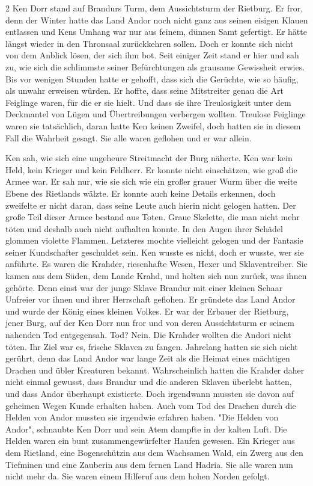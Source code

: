 \documentclass[10pt, a4paper, oneside]{book}
\begin{document}
\begin{multicols}{2}
Ken Dorr stand auf Brandurs Turm, dem Aussichtsturm der Rietburg. Er fror, denn der Winter hatte das Land Andor noch nicht ganz aus seinen eisigen Klauen entlassen und Kens Umhang war nur aus feinem, dünnen Samt gefertigt. Er hätte längst wieder in den Thronsaal zurückkehren sollen. Doch er konnte sich nicht von dem Anblick lösen, der sich ihm bot. Seit einiger Zeit stand er hier und sah zu, wie sich die schlimmste seiner Befürchtungen als grausame Gewissheit erwies. Bis vor wenigen Stunden hatte er gehofft, dass sich die Gerüchte, wie so häufig, als unwahr erweisen würden. Er hoffte, dass seine Mitstreiter genau die Art Feiglinge waren, für die er sie hielt. Und dass sie ihre Treulosigkeit unter dem Deckmantel von Lügen und Übertreibungen verbergen wollten. Treulose Feiglinge waren sie tatsächlich, daran hatte Ken keinen Zweifel, doch hatten sie in diesem Fall die Wahrheit gesagt. Sie alle waren geflohen und er war allein. 

Ken sah, wie sich eine ungeheure Streitmacht der Burg näherte. Ken war kein Held, kein Krieger und kein Feldherr. Er konnte nicht einschätzen, wie groß die Armee war. Er sah nur, wie sie sich wie ein großer grauer Wurm über die weite Ebene des Rietlands wälzte. Er konnte auch keine Details erkennen, doch zweifelte er nicht daran, dass seine Leute auch hierin nicht gelogen hatten. Der große Teil dieser Armee bestand aus Toten. Graue Skelette, die man nicht mehr töten und deshalb auch nicht aufhalten konnte. In den Augen ihrer Schädel glommen violette Flammen. Letzteres mochte vielleicht gelogen und der Fantasie seiner Kundschafter geschuldet sein. Ken wusste es nicht, doch er wusste, wer sie anführte. Es waren die Krahder, riesenhafte Wesen, Hexer und Sklaventreiber. Sie kamen aus dem Süden, dem Lande Krahd, und holten sich nun zurück, was ihnen gehörte. Denn einst war der junge Sklave Brandur mit einer kleinen Schaar Unfreier vor ihnen und ihrer Herrschaft geflohen. Er gründete das Land Andor und wurde der König eines kleinen Volkes. Er war der Erbauer der Rietburg, jener Burg, auf der Ken Dorr nun fror und von deren Aussichtsturm er seinem nahenden Tod entgegensah. Tod? Nein. Die Krahder wollten die Andori nicht töten. Ihr Ziel war es, frische Sklaven zu fangen. Jahrelang hatten sie sich nicht gerührt, denn das Land Andor war lange Zeit als die Heimat eines mächtigen Drachen und übler Kreaturen bekannt. Wahrscheinlich hatten die Krahder daher nicht einmal gewusst, dass Brandur und die anderen Sklaven überlebt hatten, und dass Andor überhaupt existierte. Doch irgendwann mussten sie davon auf geheimen Wegen Kunde erhalten haben. Auch vom Tod des Drachen durch die Helden von Andor mussten sie irgendwie erfahren haben. "Die Helden von Andor", schnaubte Ken Dorr und sein Atem dampfte in der kalten Luft. Die Helden waren ein bunt zusammengewürfelter Haufen gewesen. Ein Krieger aus dem Rietland, eine Bogenschützin aus dem Wachsamen Wald, ein Zwerg aus den Tiefminen und eine Zauberin aus dem fernen Land Hadria. Sie alle waren nun nicht mehr da. Sie waren einem Hilferuf aus dem hohen Norden gefolgt. 


\end{multicols}
\end{document}
